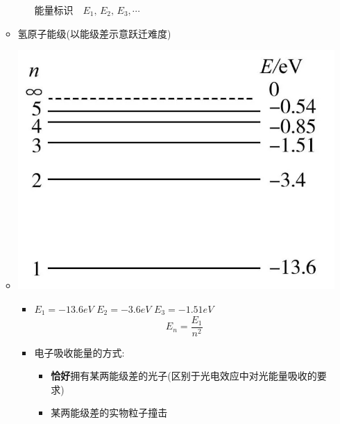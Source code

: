 \documentclass{article}
\begin{document}
\begin{itemize}
\begin{itemize}
\begin{minipage}{0.52\textwidth}
\begin{itemize}
                              $\text{能量标识} \quad E_{1}, \, E_{2}, \, E_{3}, \cdots$
                      \end{itemize}
                  \end{minipage}
                  \vspace{3em}
              \item[] 氢原子能级(以能级差示意跃迁难度)
              \item[]
                  \begin{minipage}{0.4\textwidth}
                      \includegraphics[width = \textwidth]{./pictures/19.png}
                  \end{minipage}
                  \hfill\hspace{-3em}
                  \begin{minipage}{0.52\textwidth}
                      \begin{itemize}
                          \item $E_{1}=-13.6eV \,\, E_{2} = -3.6eV \,\, E_{3} = -1.51eV $
                                $$E_{n} =  \dfrac{E_{1}}{n^{2}}$$
                          \item 电子吸收能量的方式:
                                \begin{itemize}
                                    \item[] \textbf{恰好}拥有某两能级差的光子(区别于光电效应中对光能量吸收的要求)
                                    \item[] 某两能级差的实物粒子撞击
                                \end{itemize}

\end{itemize}
\end{minipage}
\end{itemize}
\end{itemize}
\end{document}
